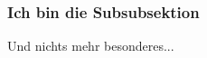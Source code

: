 \subsubsection{Ich bin die Subsubsektion}

\begin{frame}
    \centering
    Und nichts mehr besonderes...
\end{frame}

\begin{frame}
    
\end{frame}

\begin{frame}
    
\end{frame}